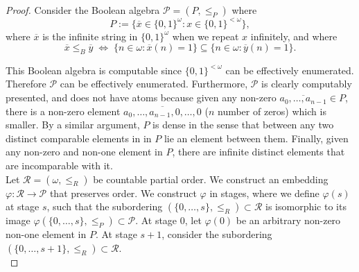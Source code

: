 \documentclass{article}
\begin{document}
  \begin{proof}
    Consider the Boolean algebra
    $\mathcal{P}=(P,\leq_P)$ where
    \[P:= \{\overline{x}\in \{0,1\}^\omega: x\in \{0,1\}^{<\omega}\},\]
    where $\overline{x}$ is the infinite string in $\{0,1\}^\omega$ when we
    repeat $x$ infinitely, and where
    \[\overline{x} \leq_B\overline{y}\; \Leftrightarrow\; \{n\in\omega:
    \overline{x}(n)=1\} \subseteq \{n\in\omega: \overline{y}(n)=1\}.\]

    This Boolean algebra is computable since $\{0,1\}^{<\omega}$ can be
    effectively enumerated. Therefore $\mathcal{P}$ can be effectively
    enumerated. Furthermore, $\mathcal{P}$ is clearly computably presented,
    and does not have atoms because given any non-zero
    $\overline{a_0,\ldots,a_{n-1}}\in P$, there is a non-zero element
    $\overline{a_0,\ldots,a_{n-1},0,\ldots,0}$ ($n$ number of zeros) which
    is smaller. By a similar argument, $P$ is dense in the sense that
    between any two distinct comparable elements in in $P$ lie an element
    between them. Finally, given any non-zero and non-one element in $P$,
    there are infinite distinct elements that are incomparable with it. \\

    Let $\mathcal{R}=(\omega,\leq_R)$ be countable partial order. We
    construct an embedding $\varphi:\mathcal{R}\rightarrow\mathcal{P}$ that
    preserves order. We construct $\varphi$ in stages, where we define
    $\varphi(s)$ at stage $s$, such that the subordering
    $(\{0,\ldots,s\},\leq_R)\subset\mathcal{R}$ is isomorphic to its image
    $\varphi(\{0,\ldots,s\},\leq_P)\subset\mathcal{P}$. At stage 0, let
    $\varphi(0)$ be an arbitrary non-zero non-one element in $P$. At stage
    $s+1$, consider the subordering
    $(\{0,\ldots,s+1\},\leq_R)\subset\mathcal{R}$. \\



\end{proof}
\end{document}
